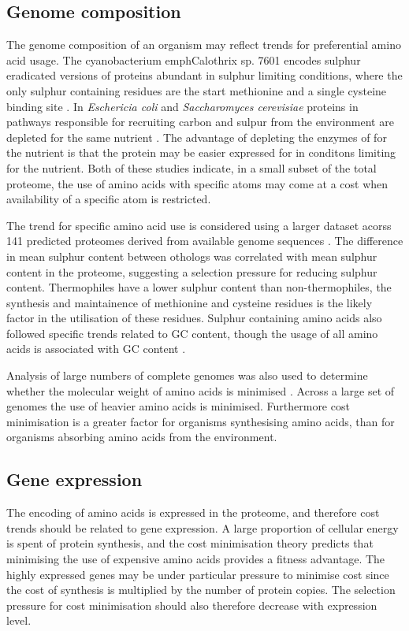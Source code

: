 \subsection{Genome composition}

The genome composition of an organism may reflect trends for preferential amino acid usage. The cyanobacterium emph{Calothrix} sp. 7601 encodes sulphur eradicated versions of proteins abundant in sulphur limiting conditions, where the only sulphur containing residues are the start methionine and a single cysteine binding site \cite{mazel1989}. In \emph{Eschericia coli} and \emph{Saccharomyces cerevisiae} proteins in pathways responsible for recruiting carbon and sulpur from the environment are depleted for the same nutrient \cite{baudoin2001}. The advantage of depleting the enzymes of for the nutrient is that the protein may be easier expressed for in conditons limiting for the nutrient. Both of these studies indicate, in a small subset of the total proteome, the use of amino acids with specific atoms may come at a cost when availability of a specific atom is restricted.

The trend for specific amino acid use is considered using a larger dataset acorss 141 predicted proteomes derived from available genome sequences \cite{bragg2006}. The difference in mean sulphur content between othologs was correlated with mean sulphur content in the proteome, suggesting a selection pressure for reducing sulphur content. Thermophiles have a lower sulphur content than non-thermophiles, the synthesis and maintainence of methionine and cysteine residues is the likely factor in the utilisation of these residues. Sulphur containing amino acids also followed specific trends related to GC content, though the usage of all amino acids is associated with GC content \cite{tekaia2006}.

Analysis of large numbers of complete genomes was also used to determine whether the molecular weight of amino acids is minimised \cite{seligmann2002}. Across a large set of genomes the use of heavier amino acids is minimised. Furthermore cost minimisation is a greater factor for organisms synthesising amino acids, than for organisms absorbing amino acids from the environment.

\subsection{Gene expression}

The encoding of amino acids is expressed in the proteome, and therefore cost trends should be related to gene expression. A large proportion of cellular energy is spent of protein synthesis, and the cost minimisation theory predicts that minimising the use of expensive amino acids provides a fitness advantage. The highly expressed genes may be under particular pressure to minimise cost since the cost of synthesis is multiplied by the number of protein copies. The selection pressure for cost minimisation should also therefore decrease with expression level.

